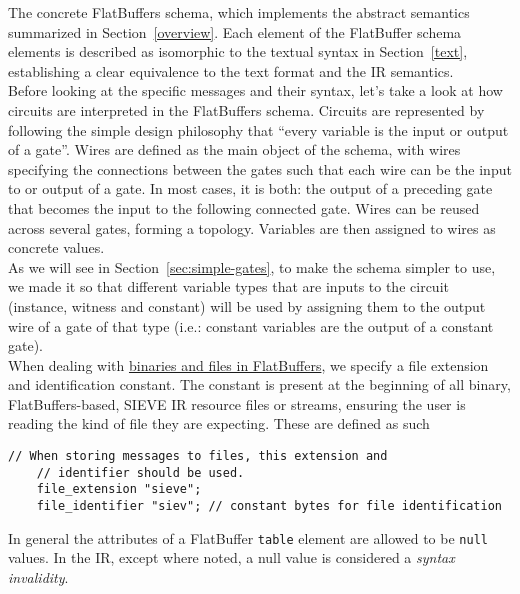 The concrete FlatBuffers schema, which implements the abstract semantics summarized in Section~\ref{overview}.
Each element of the FlatBuffer schema elements is described as isomorphic to the textual syntax in Section~\ref{text}, establishing a clear equivalence to the text format and the IR semantics. 
\\

Before looking at the specific messages and their syntax, let’s take a look at how circuits are interpreted in the FlatBuffers schema. Circuits are represented by following the simple design philosophy that ``every variable is the input or output of a gate''. \textsf{Wires} are defined as the main object of the schema, with wires specifying the connections between the gates such that each wire can be the input to or output of a gate. In most cases, it is both: the output of a preceding gate that becomes the input to the following connected gate. Wires can be reused across several gates, forming a topology. Variables are then assigned to wires as concrete values.\\

As we will see in Section~\ref{sec:simple-gates}, to make the schema simpler to use, we made it so that different variable types that are inputs to the circuit (instance, witness and constant) will be used by assigning them to the output wire of a gate of that type (i.e.: constant variables are the output of a constant gate).\\

When dealing with \href{https://google.github.io/flatbuffers/md\_\_schemas.html}{binaries and files in FlatBuffers}, we specify a file extension and identification constant. The constant is present at the beginning of all binary, FlatBuffers-based, SIEVE IR resource files or streams,  ensuring the user is reading the kind of file they are expecting. These are defined as such



\begin{lstlisting}[style=fbslisting]
    // When storing messages to files, this extension and
    // identifier should be used.
    file_extension "sieve";
    file_identifier "siev"; // constant bytes for file identification
\end{lstlisting}

In general the attributes of a FlatBuffer \texttt{table} element are allowed to be \texttt{null} values.
In the IR, except where noted, a null value is considered a \textit{syntax invalidity}.

